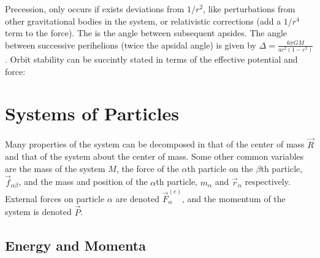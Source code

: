 Precession, only occurs if exists deviations from $1/r^2$, like perturbations from other gravitational bodies in the system, or relativistic corrections (add a $1/r^4$ term to the force). The  is the angle between subsequent apsides. The angle between successive perihelions (twice the apsidal angle) is given by $\Delta = \frac{6\pi GM}{ac^2 \left(1-\varepsilon^2\right)}$. Orbit stability can be succintly stated in terms of the effective potential and force:



\newpage
\section{Systems of Particles}
\label{sec:cm-particles}
Many properties of the system can be decomposed in that of the center of mass $\vec{R}$ and that of the system about the center of mass. Some other common variables are the mass of the system $M$, the force of the $\alpha$th particle on the $\beta$th particle, $\vec{f}_{\alpha\beta}$, and the mass and position of the $\alpha$th particle, $m_{\alpha}$ and $\vec{r}_{\alpha}$ respectively. External forces on particle $\alpha$ are denoted $\vec{F}_{\alpha}^{\left(e\right)}$, and the momentum of the system is denoted $\vec{P}$.

\subsection{Energy and Momenta}


